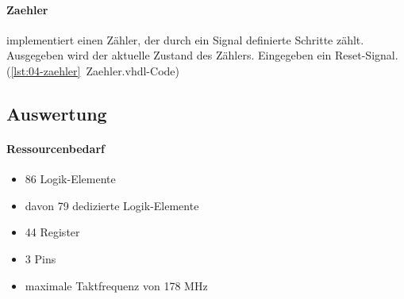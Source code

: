	\paragraph{Zaehler} implementiert einen Zähler, der durch ein Signal definierte Schritte zählt. Ausgegeben wird der aktuelle Zustand des Zählers. Eingegeben ein Reset-Signal. (\ref{lst:04-zaehler}~Zaehler.vhdl-Code) 


\subsection{Auswertung}
	\paragraph{Ressourcenbedarf}
	\begin{itemize} 
	\item 86 Logik-Elemente
	\item davon 79 dedizierte Logik-Elemente
	\item 44 Register
	\item 3 Pins 
	\item maximale Taktfrequenz von 178 MHz
	\end{itemize}
